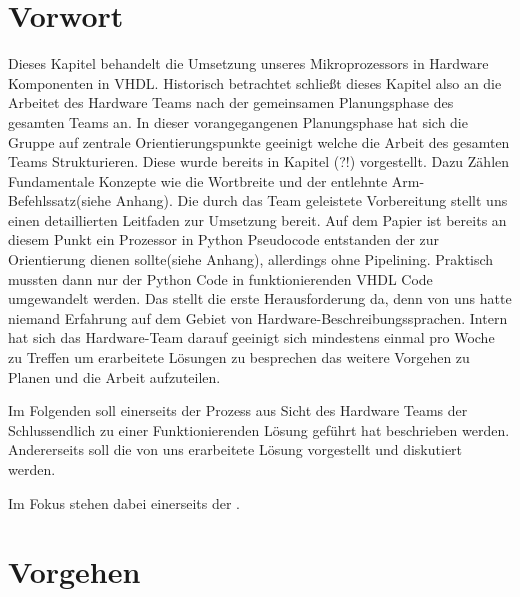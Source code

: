 \documentclass[paper=a4,fontsize=12pt]{scrreprt}
\begin{document}
\section{Vorwort}

Dieses Kapitel behandelt die Umsetzung unseres Mikroprozessors in Hardware Komponenten in VHDL. 
Historisch betrachtet schließt dieses Kapitel also an die Arbeitet des Hardware Teams nach der gemeinsamen Planungsphase des gesamten Teams an.
In dieser vorangegangenen Planungsphase hat sich die Gruppe auf zentrale Orientierungspunkte geeinigt welche die Arbeit des gesamten Teams Strukturieren. Diese wurde bereits in Kapitel (?!) vorgestellt. Dazu Zählen Fundamentale Konzepte wie die Wortbreite und der entlehnte Arm-Befehlssatz(siehe Anhang). 
Die durch das Team geleistete Vorbereitung stellt uns einen detaillierten Leitfaden zur Umsetzung bereit. Auf dem Papier ist bereits an diesem Punkt ein Prozessor in Python Pseudocode entstanden der zur Orientierung dienen sollte(siehe Anhang), allerdings ohne Pipelining. 
Praktisch mussten dann nur der Python Code in funktionierenden VHDL Code umgewandelt werden. Das stellt die erste Herausforderung da, denn von uns hatte niemand Erfahrung auf dem Gebiet von Hardware-Beschreibungssprachen. Intern hat sich das Hardware-Team darauf geeinigt sich mindestens einmal pro Woche zu Treffen um erarbeitete Lösungen zu besprechen das weitere Vorgehen zu Planen und die Arbeit aufzuteilen.

Im Folgenden soll einerseits der Prozess aus Sicht des Hardware Teams der Schlussendlich zu einer Funktionierenden Lösung geführt hat beschrieben werden.  Andererseits soll die von uns erarbeitete Lösung vorgestellt und diskutiert werden.

Im Fokus stehen dabei einerseits der .

\section{Vorgehen}
\end{document}
